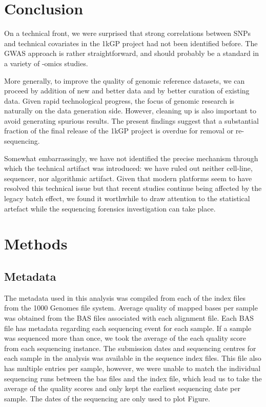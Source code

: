 \documentclass[9pt,lineno]{elife}
\begin{document}
\section{Conclusion}

On a technical front, we were surprised that strong correlations between SNPs and technical covariates in the 1kGP project had not been identified before. 
The GWAS approach is rather straightforward, and should probably be a standard in a variety of -omics studies. 

More generally, to improve the quality of genomic reference datasets, we can proceed by addition of new and better data and by better curation of existing data. 
Given rapid technological progress, the focus of genomic research is naturally on the data generation side. However, cleaning up is also important to avoid generating spurious results. 
The present findings suggest that a substantial fraction of the final release of the 1kGP project is overdue for removal or re-sequencing. 

Somewhat embarrassingly, we have not identified the precise mechanism through which the technical artifact was introduced: we have ruled out neither cell-line, sequencer, nor algorithmic artifact. 
Given that modern platforms seem to have resolved this technical issue but that recent studies continue being affected by the legacy batch effect, we found it worthwhile to draw attention to the statistical artefact while the sequencing forensics investigation can take place.     


\section{Methods}
\subsection{Metadata}
The metadata used in this analysis was compiled from each of the index files from the 1000 Genomes file system. 
Average quality of mapped bases per sample was obtained from the BAS files associated with each alignment file. 
Each BAS file has metadata regarding each sequencing event for each sample. 
If a sample was sequenced more than once, we took the average of the each quality score from each sequencing instance. 
The submission dates and sequencing centres for each sample in the analysis was available in the sequence index files.  
This file also has multiple entries per sample, however, we were unable to match the individual sequencing runs between the bas files and the index file, which lead us to take the average of the quality scores and only kept the earliest sequencing date per sample. 
The dates of the sequencing are only used to plot Figure.
\end{document}

